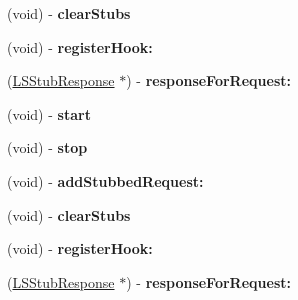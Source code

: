 \begin{DoxyCompactItemize}
\item 
\hypertarget{interface_l_s_nocilla_aca31e9357a78120393f0cfb538360707}{(void) -\/ {\bfseries clear\-Stubs}}\label{interface_l_s_nocilla_aca31e9357a78120393f0cfb538360707}

\item 
\hypertarget{interface_l_s_nocilla_aa787aea554dc67b1880b183ec7b091f5}{(void) -\/ {\bfseries register\-Hook\-:}}\label{interface_l_s_nocilla_aa787aea554dc67b1880b183ec7b091f5}

\item 
\hypertarget{interface_l_s_nocilla_affd0430092d4c595a99df1ff581adcc1}{(\hyperlink{interface_l_s_stub_response}{L\-S\-Stub\-Response} $\ast$) -\/ {\bfseries response\-For\-Request\-:}}\label{interface_l_s_nocilla_affd0430092d4c595a99df1ff581adcc1}

\item 
\hypertarget{interface_l_s_nocilla_ab854c32d42b3aa2cf87b42b4b7780fca}{(void) -\/ {\bfseries start}}\label{interface_l_s_nocilla_ab854c32d42b3aa2cf87b42b4b7780fca}

\item 
\hypertarget{interface_l_s_nocilla_a56593121ff9cc9eb8797115d98cde10f}{(void) -\/ {\bfseries stop}}\label{interface_l_s_nocilla_a56593121ff9cc9eb8797115d98cde10f}

\item 
\hypertarget{interface_l_s_nocilla_ad5f2491086f08b6d151453d447e8e4b8}{(void) -\/ {\bfseries add\-Stubbed\-Request\-:}}\label{interface_l_s_nocilla_ad5f2491086f08b6d151453d447e8e4b8}

\item 
\hypertarget{interface_l_s_nocilla_aca31e9357a78120393f0cfb538360707}{(void) -\/ {\bfseries clear\-Stubs}}\label{interface_l_s_nocilla_aca31e9357a78120393f0cfb538360707}

\item 
\hypertarget{interface_l_s_nocilla_aa787aea554dc67b1880b183ec7b091f5}{(void) -\/ {\bfseries register\-Hook\-:}}\label{interface_l_s_nocilla_aa787aea554dc67b1880b183ec7b091f5}

\item 
\hypertarget{interface_l_s_nocilla_affd0430092d4c595a99df1ff581adcc1}{(\hyperlink{interface_l_s_stub_response}{L\-S\-Stub\-Response} $\ast$) -\/ {\bfseries response\-For\-Request\-:}}\label{interface_l_s_nocilla_affd0430092d4c595a99df1ff581adcc1}

\end{DoxyCompactItemize}

